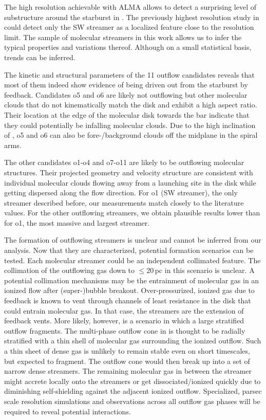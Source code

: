 The high resolution achievable with ALMA allows to detect a surprising level of substructure around the starburst in . The previously highest resolution study in \citet[32\,pc spatial resolution]{2017ApJ...835..265W} could detect only the SW streamer as a localized feature close to the resolution limit.
The sample of molecular streamers in this work allows us to infer the typical properties and variations thereof. Although on a small statistical basis, trends can be inferred.

The kinetic and structural parameters of the 11 outflow candidates reveals that most of them indeed show evidence of being driven out from the starburst by feedback. Candidates o5 and o6 are likely not outflowing but other molecular clouds that do not kinematically match the disk and exhibit a high aspect ratio. Their location at the edge of the molecular disk towards the bar indicate that they could potentially be infalling molecular clouds. Due to the high inclination of , o5 and o6 can also be fore-/background clouds off the midplane in the spiral arms.

The other candidates o1-o4 and o7-o11 are likely to be outflowing molecular structures. Their projected geometry and velocity structure are consistent with individual molecular clouds flowing away from a launching site in the disk while getting dispersed along the flow direction.
For o1 (SW streamer), the only streamer described before, our measurements match closely to the literature values. For the other outflowing streamers, we obtain plausible results lower than for o1, the most massive and largest streamer.

The formation of outflowing streamers is unclear and cannot be inferred from our analysis. Now that they are characterized, potential formation scenarios can be tested.
Each molecular streamer could be an independent collimated feature. The collimation of the outflowing gas down to $\leq 20$\,pc in this scenario is unclear. A potential collimation mechanisms may be the entrainment of molecular gas in an ionized flow after (super-)bubble breakout. Over-pressurized, ionized gas due to feedback is known to vent through channels of least resistance in the disk \citep[e.g.][]{2012ApJ...760..155K,2016MNRAS.456.3432G} that could entrain molecular gas. In that case, the streamers are the extension of feedback vents. 
More likely, however, is a scenario in which a large stratified outflow fragments. The multi-phase outflow cone in  is thought to be radially stratified \citep[as shown in Figure~\ref{introduction: figure: star formation: outflow cone}]{2015ApJ...801...63M} with a thin shell of molecular gas surrounding the ionized outflow. Such a thin sheet of dense gas is unlikely to remain stable even on short timescales, but expected to fragment. The outflow cone would then break up into a set of narrow dense streamers. The remaining molecular gas in between the streamer might accrete locally onto the streamers or get dissociated/ionized quickly due to diminishing self-shielding against the adjacent ionized outflow.
Specialized, parsec scale resolution simulations and observations across all outflow gas phases will be required to reveal potential interactions.


